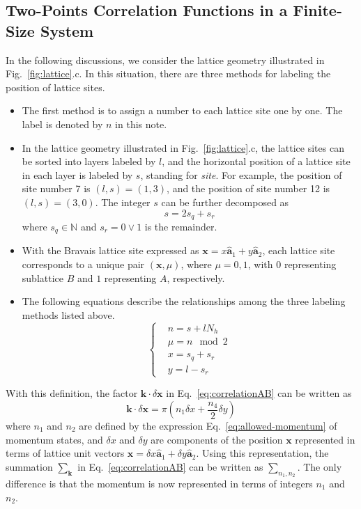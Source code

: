 \documentclass[12font]{article}
\theoremstyle{definition}
\newcommand{\lr}[1]{\left(  #1  \right)}
\newcommand{\bo}[1]{\mathbf{#1}}
\begin{document}
\subsection{Two-Points Correlation Functions in a Finite-Size System}
In the following discussions, we consider the lattice geometry illustrated in Fig.~\ref{fig:lattice}.c. In this situation, there are three methods for labeling the position of lattice sites. 
\begin{itemize}
    \item The first method is to assign a number to each lattice site one by one. The label is denoted by $n$ in this note.
    
    \item In the lattice geometry illustrated in Fig.~\ref{fig:lattice}.c, the lattice sites can be sorted into layers labeled by $l$, and the horizontal position of a lattice site in each layer is labeled by $s$, standing for \textit{site}. For example, the position of site number 7 is $(l,s) = (1,3)$, and the position of site number 12 is $(l,s) = (3,0)$. The integer $s$ can be further decomposed as
    \[
    s = 2 s_q + s_r
    \]
    where $s_q \in \mathbb{N}$ and $s_r = 0\vee 1$ is the remainder.

    \item With the Bravais lattice site expressed as $\bo{x} = x\hat{\bo{a}}_1 + y\hat{\bo{a}}_2$, each lattice site corresponds to a unique pair $(\bo{x},\mu)$, where $\mu = 0,1$, with $0$ representing sublattice $B$ and $1$ representing $A$, respectively.

    \item The following equations describe the relationships among the three labeling methods listed above.
    \[
    \left\{
    \begin{aligned}
        & n = s + lN_h \\
        & \mu = n \mod{2}\\
        & x = s_q + s_r \\
        & y = l - s_r
    \end{aligned}
    \right.
    \]
\end{itemize}
With this definition, the factor $\bo{k}\cdot\delta\bo{x}$ in Eq.~\eqref{eq:correlationAB} can be written as
\[
\bo{k}\cdot\delta\bo{x} = \pi \lr{n_1\delta x + \frac{n_4}{2}\delta y}
\]
where $n_1$ and $n_2$ are defined by the expression Eq.~\eqref{eq:allowed-momentum} of momentum states, and $\delta x$ and $\delta y$ are components of the position $\bo{x}$ represented in terms of lattice unit vectors $\bo{x} = \delta x \hat{\bo{a}}_1 + \delta y\hat{\bo{a}}_2$. Using this representation, the summation $\sum_{\bo{k}}$ in Eq.~\eqref{eq:correlationAB} can be written as $\sum_{n_1,n_2}$. The only difference is that the momentum is now represented in terms of integers $n_1$ and $n_2$.
\end{document}
